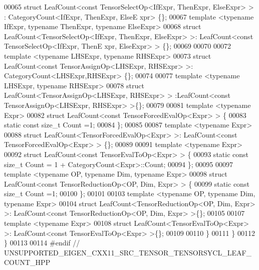 \begin{DoxyCode}
00065 \textcolor{keyword}{struct }LeafCount<const TensorSelectOp<IfExpr, ThenExpr, ElseExpr> > : CategoryCount<IfExpr, ThenExpr, ElseE
      xpr> \{\};
00067 \textcolor{keyword}{template} <\textcolor{keyword}{typename} IfExpr, \textcolor{keyword}{typename} ThenExpr, \textcolor{keyword}{typename} ElseExpr>
00068 \textcolor{keyword}{struct }LeafCount<TensorSelectOp<IfExpr, ThenExpr, ElseExpr> >: LeafCount<const TensorSelectOp<IfExpr, ThenE
      xpr, ElseExpr> > \{\};
00069 
00070 
00072 \textcolor{keyword}{template} <\textcolor{keyword}{typename} LHSExpr, \textcolor{keyword}{typename} RHSExpr>
00073 \textcolor{keyword}{struct }LeafCount<const TensorAssignOp<LHSExpr, RHSExpr> >: CategoryCount<LHSExpr,RHSExpr> \{\};
00074 
00077 \textcolor{keyword}{template} <\textcolor{keyword}{typename} LHSExpr, \textcolor{keyword}{typename} RHSExpr>
00078 \textcolor{keyword}{struct }LeafCount<TensorAssignOp<LHSExpr, RHSExpr> > :LeafCount<const TensorAssignOp<LHSExpr, RHSExpr> >\{\};
00079 
00081 \textcolor{keyword}{template} <\textcolor{keyword}{typename} Expr>
00082 \textcolor{keyword}{struct }LeafCount<const TensorForcedEvalOp<Expr> > \{
00083     \textcolor{keyword}{static} \textcolor{keyword}{const} \textcolor{keywordtype}{size\_t} Count =1;
00084 \};
00085 
00087 \textcolor{keyword}{template} <\textcolor{keyword}{typename} Expr>
00088 \textcolor{keyword}{struct }LeafCount<TensorForcedEvalOp<Expr> >: LeafCount<const TensorForcedEvalOp<Expr> > \{\};
00089 
00091 \textcolor{keyword}{template} <\textcolor{keyword}{typename} Expr>
00092 \textcolor{keyword}{struct }LeafCount<const TensorEvalToOp<Expr> > \{
00093   \textcolor{keyword}{static} \textcolor{keyword}{const} \textcolor{keywordtype}{size\_t} Count = 1 + CategoryCount<Expr>::Count;
00094 \};
00095 
00097 \textcolor{keyword}{template} <\textcolor{keyword}{typename} OP, \textcolor{keyword}{typename} Dim, \textcolor{keyword}{typename} Expr>
00098 \textcolor{keyword}{struct }LeafCount<const TensorReductionOp<OP, Dim, Expr> > \{
00099     \textcolor{keyword}{static} \textcolor{keyword}{const} \textcolor{keywordtype}{size\_t} Count =1;
00100 \};
00101 
00103 \textcolor{keyword}{template} <\textcolor{keyword}{typename} OP, \textcolor{keyword}{typename} Dim, \textcolor{keyword}{typename} Expr>
00104 \textcolor{keyword}{struct }LeafCount<TensorReductionOp<OP, Dim, Expr> >: LeafCount<const TensorReductionOp<OP, Dim, Expr> >\{\};
00105 
00107 \textcolor{keyword}{template} <\textcolor{keyword}{typename} Expr>
00108 \textcolor{keyword}{struct }LeafCount<TensorEvalToOp<Expr> >: LeafCount<const TensorEvalToOp<Expr> >\{\};
00109 
00110 \} 
00111 \} 
00112 \} 
00113 
00114 \textcolor{preprocessor}{#endif  // UNSUPPORTED\_EIGEN\_CXX11\_SRC\_TENSOR\_TENSORSYCL\_LEAF\_COUNT\_HPP}
\end{DoxyCode}
